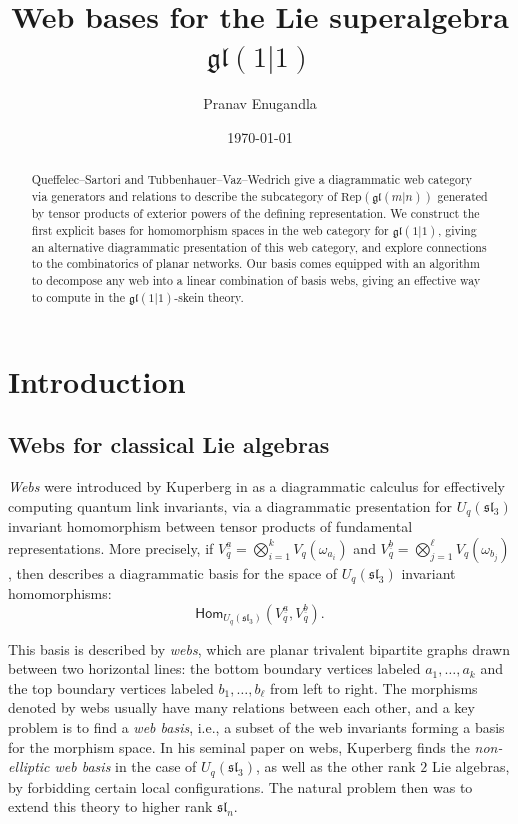 \documentclass[11pt,a4paper,reqno]{amsart}
\title{Web bases for the Lie superalgebra $\mathfrak{gl}(1|1)$}
\author[Enugandla]{Pranav Enugandla}
\date{\today}
\newcommand{\gl}{\mathfrak{gl}}
\newcommand{\rep}{\mathrm{Rep}}
\renewcommand{\a}{\alpha}
\renewcommand{\b}{\mathfrak{b}}
\renewcommand{\sl}{\mathfrak{sl}}
\numberwithin{equation}{section}
\renewcommand{\hom}{\mathsf{Hom}}
\renewcommand{\a}{\underline a}
\renewcommand{\b}{\underline b}
\theoremstyle{definition}
\theoremstyle{remark}
\begin{document}
\begin{abstract}
Queffelec--Sartori \cite{queffelec-sartori} and Tubbenhauer--Vaz--Wedrich \cite{tubbenhauer-vaz-wedrich} give a diagrammatic web category via generators and relations to describe the subcategory of $\rep(\gl(m|n))$ generated by tensor products of exterior powers of the defining representation. We construct the first explicit bases for homomorphism spaces in the web category for $\gl(1|1)$, giving an alternative diagrammatic presentation of this web category, and explore connections to the combinatorics of planar networks. Our basis comes equipped with an algorithm to decompose any web into a linear combination of basis webs, giving an effective way to compute in the $\gl(1|1)$-skein theory.
\end{abstract}

\maketitle
\section{Introduction}

\subsection{Webs for classical Lie algebras}
\emph{Webs} were introduced by Kuperberg in \cite{Kuperberg} as a diagrammatic calculus for effectively computing quantum link invariants, via a diagrammatic presentation for $U_q(\sl_3)$ invariant homomorphism between tensor products of fundamental representations. More precisely, if $V_q^{\a} = \bigotimes_{i=1}^k V_q(\omega_{a_i})$ and $V_q^{\b} = \bigotimes_{j=1}^\ell V_q(\omega_{b_j})$, then \cite{Kuperberg} describes a diagrammatic basis for the space of $U_q(\sl_3)$ invariant homomorphisms:
\[\hom_{U_q(\sl_3)}(V_q^{\a}, V_q^{\b}).\]


This basis is described by \emph{webs}, which are planar trivalent bipartite graphs drawn between two horizontal lines: the bottom boundary vertices labeled $a_1,\dots, a_k$ and the top boundary vertices labeled $b_1,\dots, b_\ell$ from left to right. The morphisms denoted by webs usually have many relations between each other, and a key problem is to find a \emph{web basis}, i.e., a subset of the web invariants forming a basis for the morphism space. In his seminal paper on webs, Kuperberg finds the \emph{non-elliptic web basis} in the case of $U_q(\sl_3)$, as well as the other rank $2$ Lie algebras, by forbidding certain local configurations. The natural problem then was to extend this theory to higher rank $\sl_n$.
\end{document}
